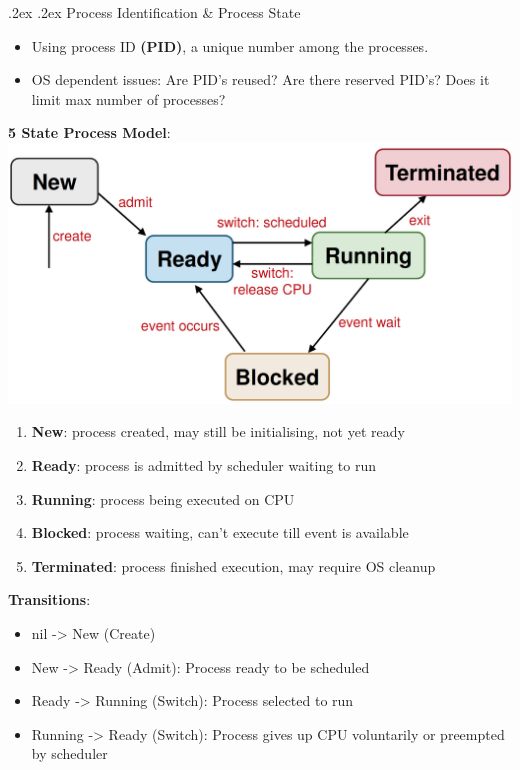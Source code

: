 \documentclass[13pt,landscape,a4paper]{article}
\makeatletter
\renewcommand{\subsection}{\@startsection{subsection}{1}{0mm}%
    {.2ex}%
    {.2ex}%
    {\sffamily\bfseries}}
\makeatother
\begin{document}
\begin{multicols*}{3}
        \subsection{Process Identification \& Process State}
        \begin{itemize}
            \item Using process ID \textbf{(PID)}, a unique number among the processes.
            \item OS dependent issues: Are PID's reused? Are there reserved PID's? Does it limit max number of processes?
        \end{itemize}
        \begin{center}
            \textbf{5 State Process Model}:\\
            \includegraphics[width=0.7\linewidth]{process-state}
        \end{center}
        \begin{enumerate}
            \item \textbf{New}: process created, may still be initialising, not yet ready
            \item \textbf{Ready}: process is admitted by scheduler waiting to run
            \item \textbf{Running}: process being executed on CPU
            \item \textbf{Blocked}: process waiting, can't execute till event is available
            \item \textbf{Terminated}: process finished execution, may require OS cleanup
        \end{enumerate}
        \textbf{Transitions}:
        \begin{itemize}
            \item nil -> New (Create)
            \item New -> Ready (Admit): Process ready to be scheduled
            \item Ready -> Running (Switch): Process selected to run
            \item Running -> Ready (Switch): Process gives up CPU voluntarily or preempted by scheduler

\end{itemize}
\end{multicols*}
\end{document}
